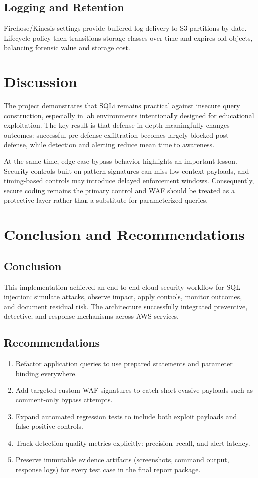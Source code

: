 \documentclass[12pt,a4paper]{article}
\begin{document}
\subsection{Logging and Retention}
Firehose/Kinesis settings provide buffered log delivery to S3 partitions by date. Lifecycle policy then transitions storage classes over time and expires old objects, balancing forensic value and storage cost.

\section{Discussion}
The project demonstrates that SQLi remains practical against insecure query construction, especially in lab environments intentionally designed for educational exploitation. The key result is that defense-in-depth meaningfully changes outcomes: successful pre-defense exfiltration becomes largely blocked post-defense, while detection and alerting reduce mean time to awareness.

At the same time, edge-case bypass behavior highlights an important lesson. Security controls built on pattern signatures can miss low-context payloads, and timing-based controls may introduce delayed enforcement windows. Consequently, secure coding remains the primary control and WAF should be treated as a protective layer rather than a substitute for parameterized queries.

\section{Conclusion and Recommendations}
\subsection{Conclusion}
This implementation achieved an end-to-end cloud security workflow for SQL injection: simulate attacks, observe impact, apply controls, monitor outcomes, and document residual risk. The architecture successfully integrated preventive, detective, and response mechanisms across AWS services.

\subsection{Recommendations}
\begin{enumerate}
  \item Refactor application queries to use prepared statements and parameter binding everywhere.
  \item Add targeted custom WAF signatures to catch short evasive payloads such as comment-only bypass attempts.
  \item Expand automated regression tests to include both exploit payloads and false-positive controls.
  \item Track detection quality metrics explicitly: precision, recall, and alert latency.
  \item Preserve immutable evidence artifacts (screenshots, command output, response logs) for every test case in the final report package.
\end{enumerate}
\end{document}

